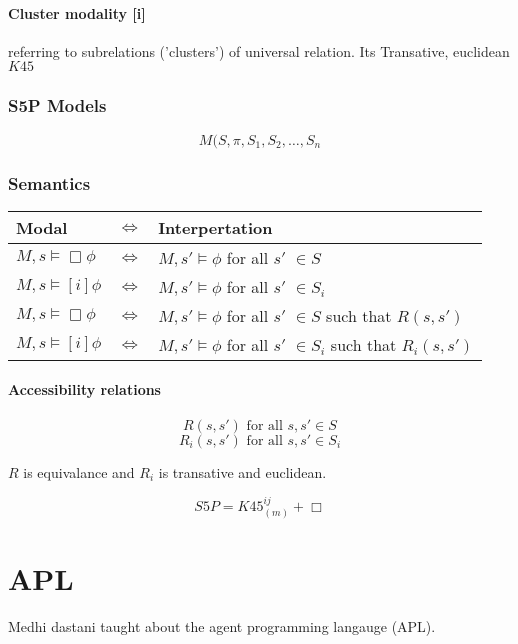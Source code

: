 \documentclass{article}
\begin{document}
\paragraph{Cluster modality [i]} referring to subrelations ('clusters') of
universal relation. Its Transative, euclidean $K45$

\subsubsection{S5P Models}
\[M (S,\pi, S_1, S_2, \dots, S_n\]

\subsubsection{Semantics}
\begin{tabular}{lll}
	Modal & $\Leftrightarrow$ & Interpertation \\ \toprule
	$M,s \vDash \Box\phi$ & $\Leftrightarrow$ &
	$M,s' \vDash \phi$ for all $s'$ $\in S$ \\

	$M,s \vDash [i]\phi$ & $\Leftrightarrow$ &
	$M,s' \vDash \phi $ for all $s'$ $\in S_i$ \\

	$M,s \vDash \Box\phi$ & $\Leftrightarrow$ &
	$M,s' \vDash \phi $ for all $s'$ $\in S$ such that $R(s,s')$ \\

	$M,s \vDash [i]\phi$ & $\Leftrightarrow$ &
	$M,s' \vDash \phi $ for all $s'$ $\in S_i$ such that $R_i(s,s')$ \\
\end{tabular}

\paragraph{Accessibility relations}
\[R(s,s') \mbox{ for all } s,s' \in S\]
\[R_i(s,s') \mbox{ for all } s,s' \in S_i\]

$R$ is equivalance and $R_i$ is transative and euclidean.


\[S5P = K45^{ij}_{(m)} + \Box\]

\section{APL}
Medhi dastani taught about the agent programming langauge (APL).
\end{document}
